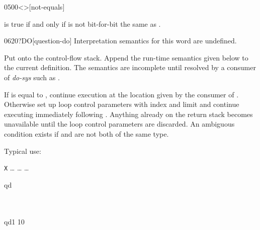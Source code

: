 \begin{worddef}[ne]{0500}{<>}[not-equals]
\item {}

	 is true if and only if  is not bit-for-bit
	the same as .
\end{worddef}

\vspace*{-1ex}\enlargethispage{8ex}
\begin{worddef}[qDO]{0620}{?DO}[question-do]
\interpret
	Interpretation semantics for this word are undefined.

\compile

	Put  onto the control-flow stack. Append the
	run-time semantics given below to the current definition. The
	semantics are incomplete until resolved by a consumer of
	\emph{do-sys} such as .

\runtime

	If  is equal to , continue
	execution at the location given by the consumer of
	. Otherwise set up loop control parameters with
	index  and limit  and continue
	executing immediately following . Anything already
	on the return stack becomes unavailable until the loop
	control parameters are discarded. An ambiguous condition
	exists if  and  are not both of
	the same type.


	\begin{rationale} %
		Typical use:

		\tab \word{:} \texttt{X} {\ldots}  {\ldots}  {\ldots} \word{;}
	\end{rationale}

	\begin{testing} %
	\ttfamily

	\word{:} qd    \word{;} \\
	 \\
	 \\

	\word{:} qd1   10  \word{;} \\
	 \\


\end{testing}
\end{worddef}
